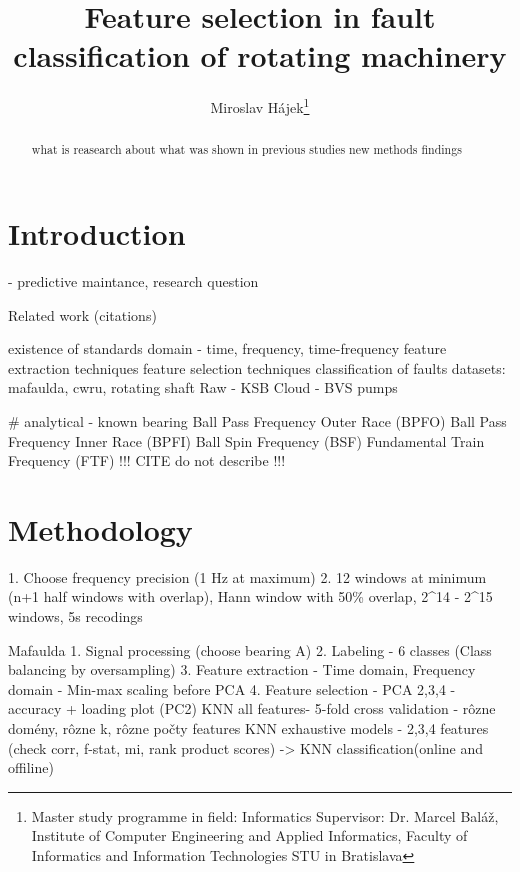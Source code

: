 \documentclass{llncs}
\begin{document}
\title{Feature selection in fault classification of rotating machinery}


\author{
	Miroslav Hájek\thanks{Master study programme in field: Informatics
	Supervisor: Dr. Marcel Baláž, Institute of Computer Engineering and Applied Informatics, Faculty of Informatics and Information Technologies STU in Bratislava }
}


\maketitle 

\begin{abstract}

what is reasearch about
what was shown in previous studies
new methods
findings

\end{abstract}


\section{Introduction}
- predictive maintance, research question

Related work (citations)

existence of standards
domain - time, frequency, time-frequency
feature extraction techniques
feature selection techniques
classification of faults
datasets: mafaulda, cwru, rotating shaft
Raw - KSB Cloud - BVS pumps

# analytical - known bearing
Ball Pass Frequency Outer Race (BPFO)
Ball Pass Frequency Inner Race (BPFI)
Ball Spin Frequency (BSF)
Fundamental Train Frequency (FTF)
!!! CITE do not describe !!!

\section{Methodology}

1. Choose frequency precision (1 Hz at maximum)
2. 12 windows at minimum (n+1 half windows with overlap), Hann window with 50\% overlap, 2^14 - 2^15 windows, 5s recodings


Mafaulda
1. Signal processing (choose bearing A)
2. Labeling - 6 classes (Class balancing by oversampling)
3. Feature extraction - Time domain, Frequency domain - Min-max scaling before PCA
4. Feature selection - 
	PCA 2,3,4 - accuracy + loading plot (PC2)
	KNN all features- 5-fold cross validation - rôzne domény, rôzne k, rôzne počty features
	KNN exhaustive models - 
		2,3,4 features (check corr, f-stat, mi, rank product scores)
	 -> KNN classification(online and offiline)
\end{document}
